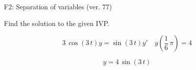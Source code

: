 \begin{exercise}
  \begin{exerciseTitle}F2: Separation of variables (ver. 77)\end{exerciseTitle}
  \begin{exerciseStatement}
    
Find the solution to the given IVP.

    
\[3 \, \cos\left(3 \, t\right) y= \sin\left(3 \, t\right) y'\hspace{1em} y\left( \frac{1}{6} \, \pi \right)= 4\]

  \end{exerciseStatement}
  \begin{exerciseAnswer}
    
\[y= 4 \, \sin\left(3 \, t\right)\]

  \end{exerciseAnswer}
\end{exercise}